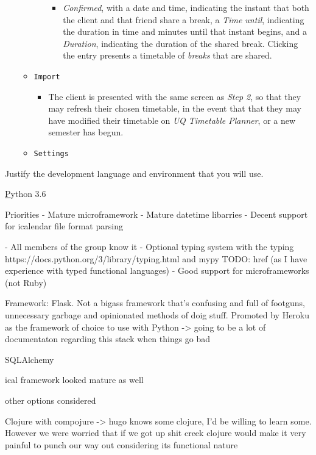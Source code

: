\documentclass[11pt,a4paper]{report}
\begin{document}
\begin{itemize}
\begin{itemize}
\begin{itemize}
\begin{itemize}
                            \item \textit{Confirmed}, with a date and time, indicating the instant that both the client and that friend share a break, a \textit{Time until}, indicating the duration in time and minutes until that instant begins, and a \textit{Duration}, indicating the duration of the shared break. Clicking the entry presents a timetable of \textit{breaks} that are shared.
                        \end{itemize}
                \end{itemize}
            \item \texttt{Import}
                \begin{itemize}
                    \item The client is presented with the same screen as \textit{Step 2}, so that they may refresh their chosen timetable, in the event that that they may have modified their timetable on \textit{UQ Timetable Planner}, or a new semester has begun.
                \end{itemize}
            \item \texttt{Settings}
        \end{itemize}
\end{itemize}


Justify the development language and environment that you will use.

\href{https://www.python.org/}Python 3.6


Priorities
- Mature microframework
- Mature datetime libarries
- Decent support for icalendar file format parsing


- All members of the group know it
- Optional typing system with the typing https://docs.python.org/3/library/typing.html and mypy TODO: href (as I have experience with typed functional languages)
- Good support for microframeworks (not Ruby)

Framework: Flask. Not a bigass framework that's confusing and full of footguns, unnecessary garbage and opinionated methods of doig stuff.
Promoted by Heroku as the framework of choice to use with Python -> going to be a lot of documentaton regarding this stack when things go bad

SQLAlchemy

ical framework looked mature as well

other options considered


Clojure with compojure -> hugo knows some clojure, I'd be willing to learn some. However we were worried that if we got up shit creek clojure would make it very painful to punch our way out considering its functional nature
\end{document}
